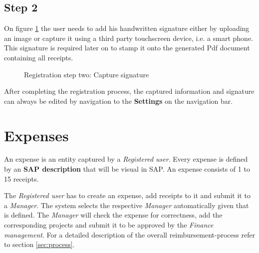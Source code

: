 \subsection{Step 2}
On figure \ref{fig:registration-step02} the user needs to add his handwritten signature either by uploading an image or capture it using a third party touchscreen device, i.e. a smart phone. This signature is required later on to stamp it onto the generated Pdf document containing all receipts.

\begin{figure}[H]
    \centering
    \caption{Registration step two: Capture signature}
    \label{fig:registration-step02}
\end{figure}

After completing the registration process, the captured information and signature can always be edited by navigation to the \textbf{Settings} on the navigation bar.

\section{Expenses}

An expense is an entity captured by a \textit{Registered user}. Every expense is defined by an \textbf{SAP description} that will be visual in SAP. An expense consists of 1 to 15 receipts.

The \textit{Registered user} has to create an expense, add receipts to it and submit it to a \textit{Manager}. The system selects the respective \textit{Manager} automatically given that is defined. The \textit{Manager} will check the expense for correctness, add the corresponding projects and submit it to be approved by the \textit{Finance management}. For a detailed description of the overall reimbursement-process refer to section \ref{sec:process}.

